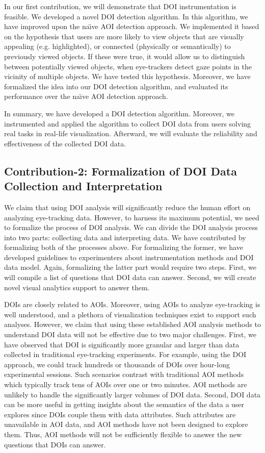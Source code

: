 In our first contribution,  we will demonstrate that DOI instrumentation is feasible. We developed a novel DOI detection algorithm. In this algorithm, we have improved upon the na\"{\i}ve AOI detection approach. We implemented it based on the hypothesis that users are more likely to view objects that are visually appealing (e.g. highlighted), or connected (physically or semantically) to previously viewed objects. If these were true, it would allow us to distinguish between potentially viewed objects, when eye-trackers detect gaze points in the vicinity of multiple objects. We have tested this hypothesis. Moreover, we have formalized the idea into our DOI detection algorithm, and evaluated its performance over the na\"{\i}ve AOI detection approach.  

In summary, we have developed a DOI detection algorithm. Moreover, we instrumented and applied the algorithm to collect DOI data from users solving real tasks in real-life visualization. Afterward, we will evaluate the reliability and effectiveness of the collected DOI data.

\subsection{Contribution-2: Formalization of DOI Data Collection and Interpretation}
\label{sec:Contribution-2}

We claim that using DOI analysis will significantly reduce the human effort on analyzing eye-tracking data. However, to harness its maximum potential, we need to formalize the process of DOI analysis. We can divide the DOI analysis process into two parts: collecting data and interpreting data. We have contributed by formalizing both of the processes above. For formalizing the former, we have developed guidelines to experimenters about instrumentation methods and DOI data model. Again, formalizing the latter part would require two steps. First, we will compile a list of questions that DOI data can answer. Second, we will create novel visual analytics support to answer them. 

DOIs are closely related to AOIs. Moreover, using AOIs to analyze eye-tracking is well understood, and a plethora of visualization techniques exist to support such analyses. However, we claim that using these established AOI analysis methods to understand DOI data will not be effective due to two major challenges. First, we have observed that DOI is significantly more granular and larger than data collected in traditional eye-tracking experiments. For example, using the DOI approach, we could track hundreds or thousands of DOIs over hour-long experimental sessions. Such scenarios contrast with traditional AOI methods which typically track tens of AOIs over one or two minutes. AOI methods are unlikely to handle the significantly larger volumes of DOI data. Second, DOI data can be more useful in getting insights about the semantics of the data a user explores since DOIs couple them with data attributes. Such attributes are unavailable in AOI data, and AOI methods have not been designed to explore them. Thus, AOI methods will not be sufficiently flexible to answer the new questions that DOIs can answer. 

